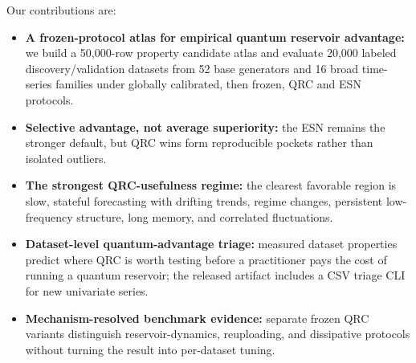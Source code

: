 Our contributions are:
\begin{itemize}
    \item \textbf{A frozen-protocol atlas for empirical quantum reservoir advantage:} we build a 50,000-row property candidate atlas and evaluate 20,000 labeled discovery/validation datasets from 52 base generators and 16 broad time-series families under globally calibrated, then frozen, QRC and ESN protocols.
    \item \textbf{Selective advantage, not average superiority:} the ESN remains the stronger default, but QRC wins form reproducible pockets rather than isolated outliers.
    \item \textbf{The strongest QRC-usefulness regime:} the clearest favorable region is slow, stateful forecasting with drifting trends, regime changes, persistent low-frequency structure, long memory, and correlated fluctuations.
    \item \textbf{Dataset-level quantum-advantage triage:} measured dataset properties predict where QRC is worth testing before a practitioner pays the cost of running a quantum reservoir; the released artifact includes a CSV triage CLI for new univariate series.
    \item \textbf{Mechanism-resolved benchmark evidence:} separate frozen QRC variants distinguish reservoir-dynamics, reuploading, and dissipative protocols without turning the result into per-dataset tuning.
\end{itemize}
